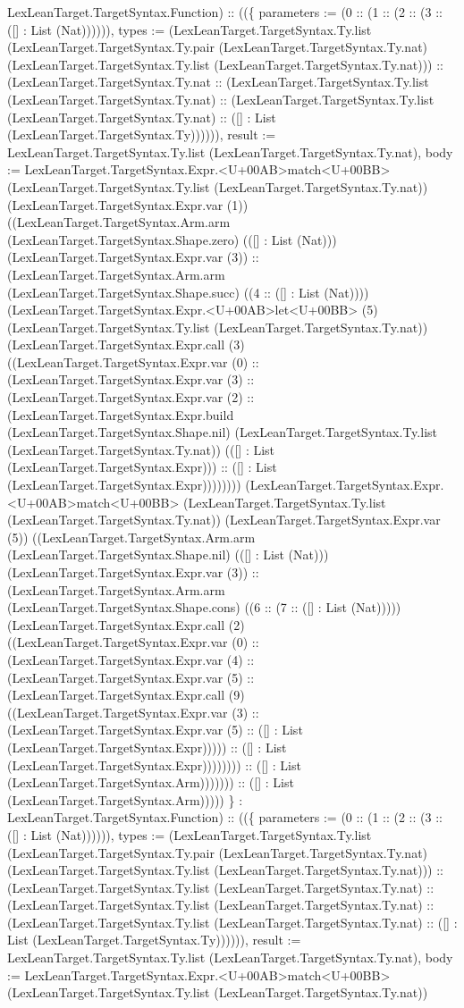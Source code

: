\documentclass[11pt]{article}
\begin{document}
LexLeanTarget.TargetSyntax.Function) :: ((\{ parameters := (0 :: (1 :: (2 :: (3 :: ([] : List (Nat)))))), types := (LexLeanTarget.TargetSyntax.Ty.list (LexLeanTarget.TargetSyntax.Ty.pair (LexLeanTarget.TargetSyntax.Ty.nat) (LexLeanTarget.TargetSyntax.Ty.list (LexLeanTarget.TargetSyntax.Ty.nat))) :: (LexLeanTarget.TargetSyntax.Ty.nat :: (LexLeanTarget.TargetSyntax.Ty.list (LexLeanTarget.TargetSyntax.Ty.nat) :: (LexLeanTarget.TargetSyntax.Ty.list (LexLeanTarget.TargetSyntax.Ty.nat) :: ([] : List (LexLeanTarget.TargetSyntax.Ty)))))), result := LexLeanTarget.TargetSyntax.Ty.list (LexLeanTarget.TargetSyntax.Ty.nat), body := LexLeanTarget.TargetSyntax.Expr.<U+00AB>match<U+00BB> (LexLeanTarget.TargetSyntax.Ty.list (LexLeanTarget.TargetSyntax.Ty.nat)) (LexLeanTarget.TargetSyntax.Expr.var (1)) ((LexLeanTarget.TargetSyntax.Arm.arm (LexLeanTarget.TargetSyntax.Shape.zero) (([] : List (Nat))) (LexLeanTarget.TargetSyntax.Expr.var (3)) :: (LexLeanTarget.TargetSyntax.Arm.arm (LexLeanTarget.TargetSyntax.Shape.succ) ((4 :: ([] : List (Nat)))) (LexLeanTarget.TargetSyntax.Expr.<U+00AB>let<U+00BB> (5) (LexLeanTarget.TargetSyntax.Ty.list (LexLeanTarget.TargetSyntax.Ty.nat)) (LexLeanTarget.TargetSyntax.Expr.call (3) ((LexLeanTarget.TargetSyntax.Expr.var (0) :: (LexLeanTarget.TargetSyntax.Expr.var (3) :: (LexLeanTarget.TargetSyntax.Expr.var (2) :: (LexLeanTarget.TargetSyntax.Expr.build (LexLeanTarget.TargetSyntax.Shape.nil) (LexLeanTarget.TargetSyntax.Ty.list (LexLeanTarget.TargetSyntax.Ty.nat)) (([] : List (LexLeanTarget.TargetSyntax.Expr))) :: ([] : List (LexLeanTarget.TargetSyntax.Expr)))))))) (LexLeanTarget.TargetSyntax.Expr.<U+00AB>match<U+00BB> (LexLeanTarget.TargetSyntax.Ty.list (LexLeanTarget.TargetSyntax.Ty.nat)) (LexLeanTarget.TargetSyntax.Expr.var (5)) ((LexLeanTarget.TargetSyntax.Arm.arm (LexLeanTarget.TargetSyntax.Shape.nil) (([] : List (Nat))) (LexLeanTarget.TargetSyntax.Expr.var (3)) :: (LexLeanTarget.TargetSyntax.Arm.arm (LexLeanTarget.TargetSyntax.Shape.cons) ((6 :: (7 :: ([] : List (Nat))))) (LexLeanTarget.TargetSyntax.Expr.call (2) ((LexLeanTarget.TargetSyntax.Expr.var (0) :: (LexLeanTarget.TargetSyntax.Expr.var (4) :: (LexLeanTarget.TargetSyntax.Expr.var (5) :: (LexLeanTarget.TargetSyntax.Expr.call (9) ((LexLeanTarget.TargetSyntax.Expr.var (3) :: (LexLeanTarget.TargetSyntax.Expr.var (5) :: ([] : List (LexLeanTarget.TargetSyntax.Expr))))) :: ([] : List (LexLeanTarget.TargetSyntax.Expr)))))))) :: ([] : List (LexLeanTarget.TargetSyntax.Arm))))))) :: ([] : List (LexLeanTarget.TargetSyntax.Arm))))) \} : LexLeanTarget.TargetSyntax.Function) :: ((\{ parameters := (0 :: (1 :: (2 :: (3 :: ([] : List (Nat)))))), types := (LexLeanTarget.TargetSyntax.Ty.list (LexLeanTarget.TargetSyntax.Ty.pair (LexLeanTarget.TargetSyntax.Ty.nat) (LexLeanTarget.TargetSyntax.Ty.list (LexLeanTarget.TargetSyntax.Ty.nat))) :: (LexLeanTarget.TargetSyntax.Ty.list (LexLeanTarget.TargetSyntax.Ty.nat) :: (LexLeanTarget.TargetSyntax.Ty.list (LexLeanTarget.TargetSyntax.Ty.nat) :: (LexLeanTarget.TargetSyntax.Ty.list (LexLeanTarget.TargetSyntax.Ty.nat) :: ([] : List (LexLeanTarget.TargetSyntax.Ty)))))), result := LexLeanTarget.TargetSyntax.Ty.list (LexLeanTarget.TargetSyntax.Ty.nat), body := LexLeanTarget.TargetSyntax.Expr.<U+00AB>match<U+00BB> (LexLeanTarget.TargetSyntax.Ty.list (LexLeanTarget.TargetSyntax.Ty.nat)) 
\end{document}
